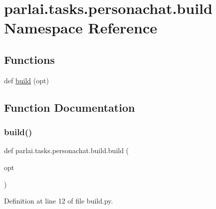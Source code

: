 \hypertarget{namespaceparlai_1_1tasks_1_1personachat_1_1build}{}\section{parlai.\+tasks.\+personachat.\+build Namespace Reference}
\label{namespaceparlai_1_1tasks_1_1personachat_1_1build}
\subsection*{Functions}
\begin{DoxyCompactItemize}
\item 
def \hyperlink{namespaceparlai_1_1tasks_1_1personachat_1_1build_a20041fc9bc8f146d3d5ddd944053807f}{build} (opt)
\end{DoxyCompactItemize}


\subsection{Function Documentation}
\mbox{\label{namespaceparlai_1_1tasks_1_1personachat_1_1build_a20041fc9bc8f146d3d5ddd944053807f}} 
\subsubsection{\texorpdfstring{build()}{build()}}
{\footnotesize\ttfamily def parlai.\+tasks.\+personachat.\+build.\+build (\begin{DoxyParamCaption}\item[{}]{opt }\end{DoxyParamCaption})}



Definition at line 12 of file build.\+py.

